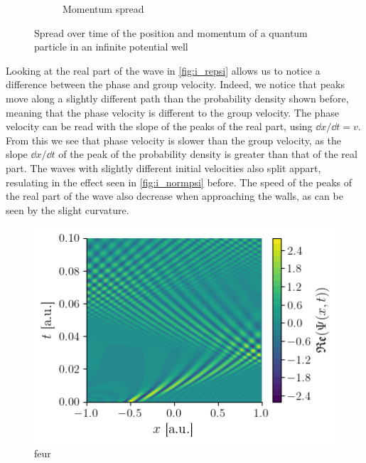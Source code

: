 \begin{figure}[h]
\begin{subfigure}{0.48\linewidth}
        \caption{Momentum spread}
        \label{fig:i_deltap}
    \end{subfigure}
    \caption{Spread over time of the position and momentum of a quantum particle in an infinite potential well}
    \label{fig:i_deltax_deltap}
\end{figure}

Looking at the real part of the wave in \autoref{fig:i_repsi} allows us to notice a difference between the phase and group velocity. Indeed, we notice that peaks move along a slightly different path than the probability density shown before, meaning that the phase velocity is different to the group velocity. The phase velocity can be read with the slope of the peaks of the real part, using \(\dd x / \dd t = v\). From this we see that phase velocity is slower than the group velocity, as the slope \(\dd x / \dd t\) of the peak of the probability density is greater than that of the real part. The waves with slightly different initial velocities also split appart, resulating in the effect seen in \autoref{fig:i_normpsi} before. The speed of the peaks of the real part of the wave also decrease when approaching the walls, as can be seen by the slight curvature.

\begin{figure}[h]
    \centering
    \includegraphics[width=0.6\linewidth]{figures/i_repsi.png}
    \caption{feur}
    \label{fig:i_repsi}
\end{figure}

